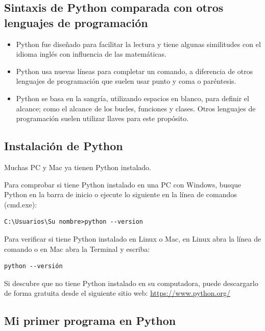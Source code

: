 \subsection{Sintaxis de Python comparada con otros lenguajes de
programación}\label{sintaxis-de-python-comparada-con-otros-lenguajes-de-programaciuxf3n}

\begin{itemize}
\item
  Python fue diseñado para facilitar la lectura y tiene algunas
  similitudes con el idioma inglés con influencia de las matemáticas.
\item
  Python usa nuevas líneas para completar un comando, a diferencia de
  otros lenguajes de programación que suelen usar punto y coma o
  paréntesis.
\item
  Python se basa en la sangría, utilizando espacios en blanco, para
  definir el alcance; como el alcance de los bucles, funciones y clases.
  Otros lenguajes de programación suelen utilizar llaves para este
  propósito.
\end{itemize}

\subsection{Instalación de Python}\label{instalaciuxf3n-de-python}

Muchas PC y Mac ya tienen Python instalado.

Para comprobar si tiene Python instalado en una PC con Windows, busque
Python en la barra de inicio o ejecute lo siguiente en la línea de
comandos (cmd.exe):

\begin{verbatim}
C:\Usuarios\Su nombre>python --version
\end{verbatim}

Para verificar si tiene Python instalado en Linux o Mac, en Linux abra
la línea de comando o en Mac abra la Terminal y escriba:

\begin{verbatim}
python --versión
\end{verbatim}

Si descubre que no tiene Python instalado en su computadora, puede
descargarlo de forma gratuita desde el siguiente sitio web:
\url{https://www.python.org/}

\subsection{Mi primer programa en Python}\label{mi-primer-programa-en-python}

